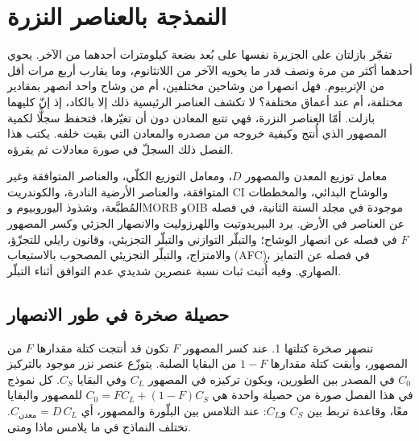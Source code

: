\chapter{النمذجة بالعناصر النزرة}\label{ch:b3:trace-element-modelling}

تفجّر بازلتان على الجزيرة نفسها على بُعد بضعة كيلومترات أحدهما من الآخر. يحوي أحدهما
أكثر من مرة ونصف قدر ما يحويه الآخر من اللانثانوم، وما يقارب أربع مرات
أقل من الإتربيوم. فهل انصهرا من وشاحين مختلفين، أم من وشاح واحد
انصهر بمقادير مختلفة، أم عند أعماق مختلفة؟ لا تكشف العناصر الرئيسية
ذلك إلا بالكاد، إذ إنّ كليهما بازلت. أمّا العناصر النزرة، فهي تتبع المعادن
دون أن تغيّرها، فتحفظ سجلًّا لكمية المصهور الذي أُنتج وكيفية خروجه
من مصدره والمعادن التي بقيت خلفه. يكتب هذا الفصل ذلك السجلّ
في صورة معادلات ثم يقرؤه.

\begin{recall}
معامل توزيع المعدن والمصهور $D$، ومعامل التوزيع الكلّي،
والعناصر المتوافقة وغير المتوافقة، والعناصر الأرضية النادرة، والكوندريت CI
والوشاح البدائي، والمخططات المُطبَّعة، وشذوذ اليوروبيوم
وMORB وOIB موجودة في مجلد السنة الثانية، في فصله عن العناصر في
الأرض. يرد البيريدوتيت واللهرزوليت والانصهار الجزئي وكسر المصهور $F$
في فصله عن انصهار الوشاح؛ والتبلّر التوازني والتبلّر التجزيئي،
وقانون رايلي للتجزّؤ، والامتزاج،
والتبلّر التجزيئي المصحوب بالاستيعاب (AFC)، في فصله عن
التمايز الصهاري. وفيه أُثبت ثبات نسبة عنصرين شديدي عدم التوافق
أثناء التبلّر.
\end{recall}

\section{حصيلة صخرة في طور الانصهار}\label{sec:b3:trace-element-modelling:balance}

تنصهر صخرة كتلتها 1. عند كسر المصهور $F$ تكون قد أنتجت كتلة مقدارها $F$ من
المصهور، وأبقت كتلة مقدارها $1 - F$ من البقايا الصلبة. يتوزّع عنصر نزر
موجود بالتركيز $C_0$ في المصدر بين الطورين، ويكون تركيزه
في المصهور $C_L$ وفي البقايا $C_S$. كل نموذج في هذا الفصل صورة من حصيلة واحدة
هي $C_0 = FC_L + (1 - F)C_S$ للمصهور والبقايا معًا،
وقاعدة تربط بين $C_S$ و$C_L$: عند التلامس بين البلّورة والمصهور،
أي $C_{\text{معدن}} = D\,C_L$. تختلف النماذج في ما يلامس ماذا
ومتى.


